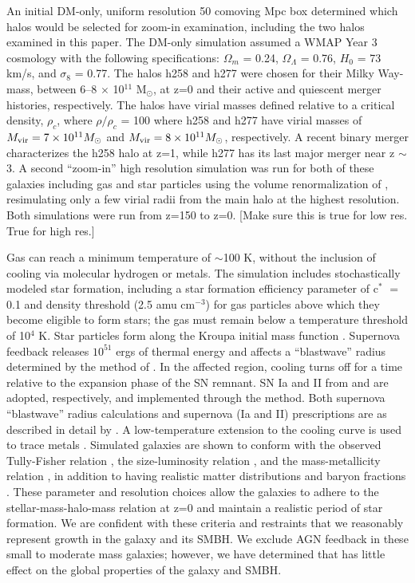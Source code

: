 \documentclass[12pt,headA,chapB]{fiskthesis}
\begin{document}
An initial DM-only, uniform resolution 50 comoving Mpc box determined which halos would be selected for zoom-in examination, including the two halos examined in this paper. The DM-only simulation assumed a WMAP Year 3 cosmology \citep{Spergel2007} with the following specifications: $\Omega _m$ = 0.24, $\Omega _{\Lambda}$ = 0.76, $H_0$ = 73 km/s, and $\sigma _8$ = 0.77. The halos h258 and h277  were chosen for their Milky Way-mass, between 6--8 $\times$ 10$^{11}$  M$_{\odot}$, at z=0 and their active and quiescent merger histories, respectively. The halos have virial masses defined relative to a critical density, $\rho _c$, where $\rho / \rho _c$ = 100 where h258 and h277 have virial masses of $M_{\rm vir} = 7 \times 10^{11} M_{\odot}$ and $M_{\rm vir} = 8 \times 10^{11} M_{\odot}$, respectively. A recent binary merger characterizes the h258 halo at z=1, while h277 has its last major merger near z $\sim$ 3. A second ``zoom-in'' high resolution simulation was run for both of these galaxies including gas and star particles using the volume renormalization of \cite{Katz1993}, resimulating only a few virial radii from the main halo at the highest resolution. Both simulations were run from z=150 to z=0.  [Make sure this is true for low res. True for high res.]

Gas can reach a minimum temperature of $\sim$100 K, without the inclusion of cooling via molecular hydrogen or metals. The simulation includes stochastically modeled star formation, including a star formation efficiency parameter of c$^*$ $=$ 0.1 and density threshold (2.5 amu cm$^{-3}$) for gas particles above which they become eligible to form stars; the gas must remain below a temperature threshold of 10$^4$ K. Star particles form along the Kroupa initial mass function \citep{Kroupa2001}. Supernova feedback releases $10^{51}$ ergs of thermal energy and affects a ``blastwave'' radius determined by the method of \cite{Ostriker1988}. In the affected region, cooling turns off for a time relative to the expansion phase of the SN remnant. SN Ia and II from \cite{Thielemann1986} and \cite{Woosley1986} are adopted, respectively, and implemented through the \cite{Raiteri1996} method. Both supernova ``blastwave'' radius calculations and supernova (Ia and II) prescriptions are as described in detail by \cite{Stinson2006}. A low-temperature extension to the cooling curve is used to trace metals \citep{Bromm2001}. Simulated galaxies are shown to conform with the observed Tully-Fisher relation \citep{Governato2009}, the size-luminosity relation \citep{Brooks2011}, and the mass-metallicity relation \citep{Brooks2007}, in addition to having realistic matter distributions and baryon fractions \citep{Governato2009a,Guedes2011}. These parameter and resolution choices allow the galaxies to adhere to the stellar-mass-halo-mass relation at z=0 and maintain a realistic period of star formation. \citep{Moster2010,Munshi2013,Brooks2007,Maiolino2008} We are confident with these criteria and restraints that we reasonably represent growth in the galaxy and its SMBH. We exclude AGN feedback in these small to moderate mass galaxies; however, we have determined that has little effect on the global properties of the galaxy and SMBH.
 
\end{document}
